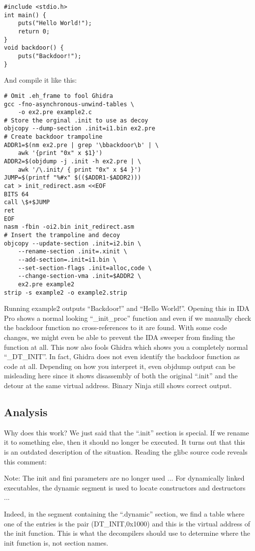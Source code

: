 \documentclass[twocolumn]{article}
\begin{document}
\begin{verbatim}
#include <stdio.h>
int main() {
    puts("Hello World!");
    return 0;
}
void backdoor() {
    puts("Backdoor!");
}
\end{verbatim}

And compile it like this:

\begin{verbatim}
# Omit .eh_frame to fool Ghidra
gcc -fno-asynchronous-unwind-tables \
    -o ex2.pre example2.c
# Store the orginal .init to use as decoy
objcopy --dump-section .init=i1.bin ex2.pre
# Create backdoor trampoline
ADDR1=$(nm ex2.pre | grep '\bbackdoor\b' | \
    awk '{print "0x" x $1}')
ADDR2=$(objdump -j .init -h ex2.pre | \
    awk '/\.init/ { print "0x" x $4 }')
JUMP=$(printf "%#x" $(($ADDR1-$ADDR2)))
cat > init_redirect.asm <<EOF
BITS 64
call \$+$JUMP
ret
EOF
nasm -fbin -oi2.bin init_redirect.asm
# Insert the trampoline and decoy
objcopy --update-section .init=i2.bin \
    --rename-section .init=.xinit \
    --add-section=.init=i1.bin \
    --set-section-flags .init=alloc,code \
    --change-section-vma .init=$ADDR2 \
    ex2.pre example2
strip -s example2 -o example2.strip
\end{verbatim}

Running example2 outputs ``Backdoor!'' and ``Hello World!''. Opening this in IDA Pro shows a normal looking ``\_init\_proc'' function and even if we manually check the backdoor function no cross-references to it are found. With some code changes, we might even be able to prevent the IDA sweeper from finding the function at all.
This now also fools Ghidra which shows you a completely normal ``\_DT\_INIT''. In fact, Ghidra does not even identify the backdoor function as code at all. Depending on how you interpret it, even objdump output can be misleading here since it shows disassembly of both the original ``.init'' and the detour at the same virtual address. Binary Ninja still shows correct output.

\vspace*{-0.5\baselineskip}
\subsection*{Analysis}

Why does this work? We just said that the ``.init'' section is special. If we rename it to something else, then it should no longer be executed. It turns out that this is an outdated description of the situation. Reading the glibc source code reveals this comment:

\begin{displayquote}
   Note: The init and fini parameters are no longer used ...
   For dynamically linked executables, the dynamic segment is used to
   locate constructors and destructors ...
\end{displayquote}

Indeed, in the segment containing the ``.dynamic'' section, we find a table where one of the entries is the pair (DT\_INIT,0x1000) and this is the virtual address of the init function. This is what the decompilers should use to determine where the init function is, not section names.

\end{document}
